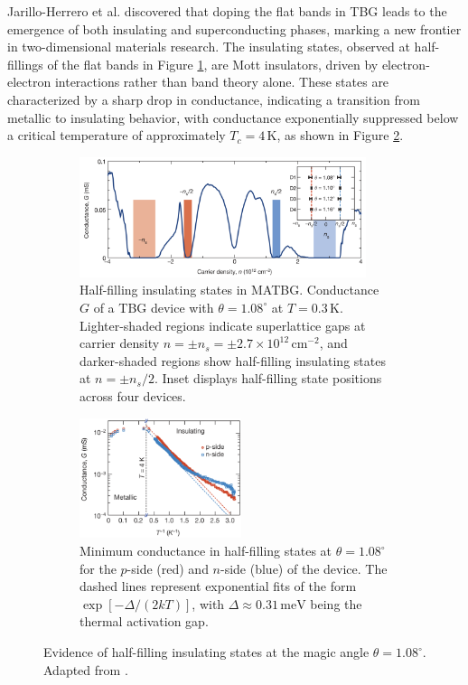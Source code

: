 Jarillo-Herrero et al. \cite{cao2018, cao2018_correlated} discovered that doping the flat bands in TBG leads to the emergence of both insulating and superconducting phases, marking a new frontier in two-dimensional materials research. The insulating states, observed at half-fillings of the flat bands in Figure \ref{fig:tbg_conductance_filling_insulating}, are Mott insulators, driven by electron-electron interactions rather than band theory alone. These states are characterized by a sharp drop in conductance, indicating a transition from metallic to insulating behavior, with conductance exponentially suppressed below a critical temperature of approximately \(T_c = 4 \, \text{K}\), as shown in Figure \ref{fig:tbg_conductance_temperature_insulating}.

\begin{figure}[H]
\centering
\begin{subfigure}{.56\textwidth}
  \centering
  \includegraphics[height=9.5em]{fig/tbg_conductance_filling_insulating.png}
  \caption{Half-filling insulating states in MATBG. Conductance \(G\) of a TBG device with \(\theta = 1.08^\circ\) at \(T = 0.3 \, \text{K}\). Lighter-shaded regions indicate superlattice gaps at carrier density \(n = \pm n_s = \pm 2.7 \times 10^{12} \, \text{cm}^{-2}\), and darker-shaded regions show half-filling insulating states at \(n = \pm n_s/2\). Inset displays half-filling state positions across four devices.}
  \label{fig:tbg_conductance_filling_insulating}
\end{subfigure} \hfill
\begin{subfigure}{.40\textwidth}
  \centering
  \includegraphics[height=9.5em]{fig/tbg_conductance_temperature_insulating.png}
  \caption{Minimum conductance in half-filling states at $\theta = 1.08^\circ$ for the \(p\)-side (red) and \(n\)-side (blue) of the device. The dashed lines represent exponential fits of the form \(\exp[-\Delta/(2kT)]\), with \(\Delta \approx 0.31 \, \text{meV}\) being the thermal activation gap.}
  \label{fig:tbg_conductance_temperature_insulating}
\end{subfigure}
\caption{Evidence of half-filling insulating states at the magic angle \(\theta = 1.08^\circ\). Adapted from \cite{cao2018_correlated}.}
\label{fig:tbg_insulating}
\end{figure}

